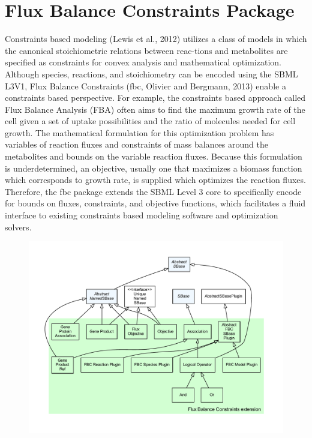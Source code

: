 \section{Flux Balance Constraints Package}
\label{sec:fbc-overview}
Constraints based modeling (Lewis et al., 2012) utilizes a class of models in which
the canonical stoichiometric relations between reac-tions and metabolites are specified
as constraints for convex analysis and mathematical optimization. Although species,
reactions, and stoichiometry can be encoded using the SBML L3V1,
Flux Balance Constraints (fbc, Olivier and Bergmann, 2013) enable a constraints
based perspective. For example, the constraints based approach called
Flux Balance Analysis (FBA) often aims to find the maximum growth rate of the
cell given a set of uptake possibilities and the ratio of molecules needed
for cell growth. The mathematical formulation for this optimization problem
has variables of reaction fluxes and constraints of mass balances around the
metabolites and bounds on the variable reaction fluxes. Because this formulation is
underdetermined, an objective, usually one that maximizes a biomass function which
corresponds to growth rate, is supplied which optimizes the reaction fluxes. Therefore,
the fbc package extends the SBML Level 3 core to specifically encode for bounds on
fluxes, constraints, and objective functions, which facilitates a fluid interface to
existing constraints based modeling software and optimization solvers.

\begin{figure}[hb]
 \centering
 \vspace*{2ex}
 \includegraphics[width=\textwidth]{../../../extensions/fbc/doc/img/type_hierarchy.pdf}
 \caption[The flux balance constraints extension]{}
 \label{fig:fbc}
\end{figure}


